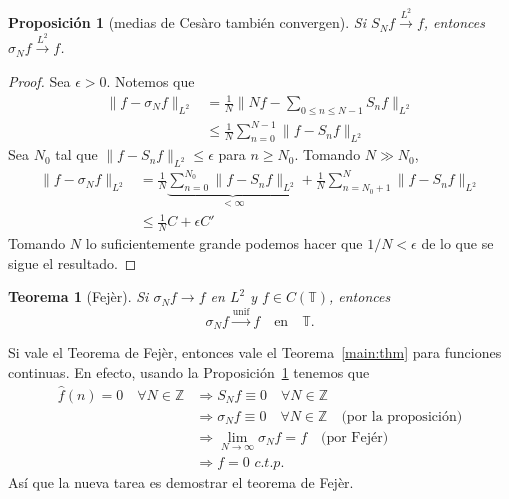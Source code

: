 \documentclass{article}
\newtheorem{Teorema}{Teorema}
\newtheorem{Proposicion}{Proposición}
\theoremstyle{plain}
\theoremstyle{definition}
\newcommand{\T}{\mathbb{T}}
\newcommand{\Z}{\mathbb{Z}}
\newcommand{\normL}[2]{\lVert #2 \rVert_{L^#1}}
\begin{document}
\begin{Proposicion}[medias de Cesàro también convergen]\label{medias-convergen}
  Si \(S_N f \xrightarrow{L^2} f\), entonces \(\sigma_N f \xrightarrow{L^2} f\).  
\end{Proposicion}
\begin{proof}
  Sea \(\epsilon > 0\). Notemos que 
  \begin{align*}
    \normL{2}{f - \sigma_N f}
    &=
    \frac{1}{N} \normL{2}{ Nf - \sum_{0\le n\le N-1} S_n f}
    \\&\le
    \frac{1}{N} \sum_{n=0}^{N-1} \normL{2}{f - S_n f}
  \end{align*}
  Sea \(N_0\) tal que \(\normL{2}{f - S_{n} f} \le \epsilon\) para \(n\ge N_0\). 
  Tomando \(N \gg N_0\),
  \begin{align*}
    \normL{2}{f - \sigma_N f}
    &=
    \frac{1}{N} \underbrace{\sum_{n=0}^{N_0} \normL{2}{f - S_n f}}_{<\infty}
    +
    \frac{1}{N} \sum_{n=N_0+1}^{N} \normL{2}{f - S_n f}
    \\&\le
    \frac{1}{N} C
    +
    \epsilon C'
  \end{align*}
  Tomando \(N\) lo suficientemente grande podemos hacer que \(1/N < \epsilon\) de lo que se 
  sigue el resultado.
\end{proof}

\begin{Teorema}[Fejèr]
  Si \(\sigma_N f \to f\) en \(L^2\) y \(f\in C(\T)\), entonces
  \begin{displaymath}
    \sigma_N f \xrightarrow{\text{unif}} f 
    \quad\text{en}\quad\T.
  \end{displaymath}
\end{Teorema}

Si vale el Teorema de Fejèr, entonces vale el Teorema~\ref{main:thm} para funciones
continuas. En efecto,
usando la Proposición~\ref{medias-convergen} tenemos que
\begin{align*}
  \hat f(n) = 0 \quad \forall N\in\Z
  &\Rightarrow
  S_N f \equiv 0 \quad \forall N\in \Z
  \\&\Rightarrow
  \sigma_N f \equiv 0 \quad \forall N\in\Z \quad \text{(por la proposición)}
  \\&\Rightarrow
  \lim_{N\to\infty} \sigma_N f = f \quad\text{(por Fejér)}
  \\&\Rightarrow
  f = 0 \,\,c.t.p.
\end{align*}
Así que la nueva tarea es demostrar el teorema de Fejèr.
\end{document}
